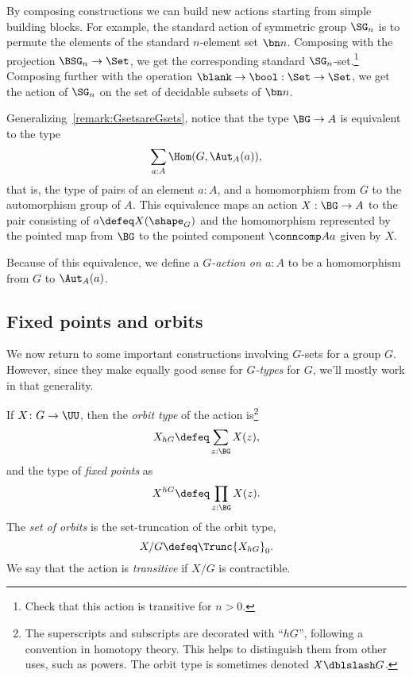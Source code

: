 \begin{example}
  By composing constructions we can build new actions
  starting from simple building blocks.
  For example, the standard action of symmetric group $\SG_n$
  is to permute the elements of the standard $n$-element set $\bn n$.
  Composing with the projection $\BSG_n \to \Set$,
  we get the corresponding standard $\SG_n$-set.\footnote{%
    Check that this action is transitive for $n>0$.}
  Composing further with the operation $\blank \to \bool : \Set \to \Set$,
  we get the action of $\SG_n$ on the set of decidable subsets of $\bn n$.
\end{example}

Generalizing~\cref{remark:GsetsareGsets},
notice that the type $\BG \to A$ is equivalent to the type
\[
  \sum_{a:A}\Hom(G,\Aut_A(a)),
\]
that is, the type of pairs of an element $a : A$,
and a homomorphism from $G$ to the automorphism group of $A$.
This equivalence maps an action $X:\BG\to A$
to the pair consisting of $a \defeq X(\shape_G)$
and the homomorphism represented by the pointed map
from $\BG$ to the pointed component $\conncomp A a$ given by $X$.

Because of this equivalence,
we define a \emph{$G$-action on $a:A$}
to be a homomorphism from $G$ to $\Aut_A(a)$.

\subsection{Fixed points and orbits}
\label{sec:fixpts-orbits}
We now return to some important constructions involving $G$-sets for a group $G$.
However, since they make equally good sense for \emph{$G$-types} for \aninftygp
$G$, we'll mostly work in that generality.
\begin{definition}
  \label{def:orbittype}
  If $X\colon G\to\UU$, then the \emph{orbit type}
  of the action is\footnote{%
    The superscripts and subscripts are decorated with ``$hG$'',
    following a convention in homotopy theory.
    This helps to distinguish them from other uses, such as powers.
    The orbit type is sometimes denoted $X \dblslash G$.}
\[
  X_{hG} \defeq \sum_{z:\BG} X(z),
\]
and the type of \emph{fixed points} as
\[
  X^{hG} \defeq \prod_{z:\BG} X(z).
\]
The \emph{set of orbits} is the set-truncation of the orbit type,
\[
  X / G \defeq \Trunc{X_{hG}}_0.
\]
We say that the action is \emph{transitive}
if $X / G$ is contractible.
\end{definition}

